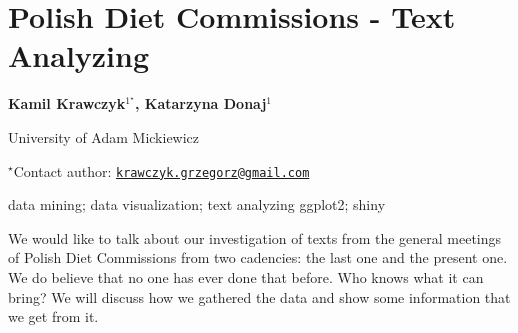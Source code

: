 \documentclass[\main/boa.tex]{subfiles}
\begin{document}
\pagestyle{empty}

\section{Polish Diet Commissions - Text Analyzing}

\begin{center}
  {\bf Kamil Krawczyk$^{1^\star}$, Katarzyna Donaj$^{1}$}
\end{center}

\vskip 0.3cm

\begin{affiliations}
\begin{enumerate}
\begin{minipage}{0.915\textwidth}
\centering
\item University of Adam Mickiewicz \\[-2pt]
\end{minipage}
\end{enumerate}
$^\star$Contact author: \href{mailto:krawczyk.grzegorz@gmail.com}{\nolinkurl{krawczyk.grzegorz@gmail.com}}\\
\end{affiliations}

\vskip 0.5cm

\begin{minipage}{0.915\textwidth}
\keywords data mining; data visualization; text analyzing
\packages ggplot2; shiny
\end{minipage}

\vskip 0.8cm

We would like to talk about our investigation of texts from the general
meetings of Polish Diet Commissions from two cadencies: the last one and
the present one. We do believe that no one has ever done that before.
Who knows what it can bring? We will discuss how we gathered the data
and show some information that we get from it.
\end{document}
